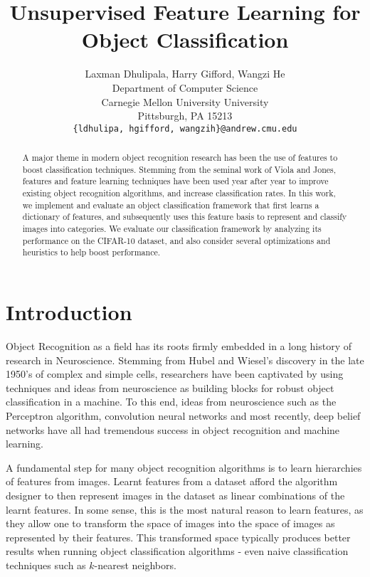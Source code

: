 \documentclass{article} %
\title{Unsupervised Feature Learning for Object Classification}
\author{
Laxman Dhulipala, Harry Gifford, Wangzi He \\
Department of Computer Science\\
Carnegie Mellon University University\\
Pittsburgh, PA 15213 \\
\texttt{\{ldhulipa, hgifford, wangzih\}@andrew.cmu.edu} \\
}
\begin{document}
\maketitle

\begin{abstract}
A major theme in modern object recognition research has been the use of 
features to boost classification techniques. Stemming from the seminal work
of Viola and Jones, features and feature learning techniques have been used 
year after year to improve existing object recognition algorithms, and increase 
classification rates. In this work, we implement and evaluate an object classification framework 
that first learns a dictionary of features, and subsequently uses this feature basis 
to represent and classify images into categories. We evaluate our classification framework
by analyzing its performance on the CIFAR-10 dataset, and also consider several optimizations
and heuristics to help boost performance. 
\end{abstract}

\section{Introduction}

Object Recognition as a field has its roots firmly embedded in a long history 
of research in Neuroscience. Stemming from Hubel and Wiesel's discovery in the 
late 1950's of complex and simple cells, researchers have been captivated by using
techniques and ideas from neuroscience as building blocks for robust object 
classification in a machine\cite{hubel}. To this end, ideas from neuroscience such as the Perceptron
algorithm, convolution neural networks and most recently, deep belief networks have all
had tremendous success in object recognition and machine learning. 

A fundamental step for many object recognition algorithms is to learn hierarchies
of features from images. Learnt features from a dataset afford the algorithm designer
to then represent images in the dataset as linear combinations of the learnt features. 
In some sense, this is the most natural reason to learn features, as they allow one 
to transform the space of images into the space of images as represented by their features.
This transformed space typically produces better results when running object classification
algorithms - even naive classification techniques such as $k$-nearest neighbors. 
\end{document}
